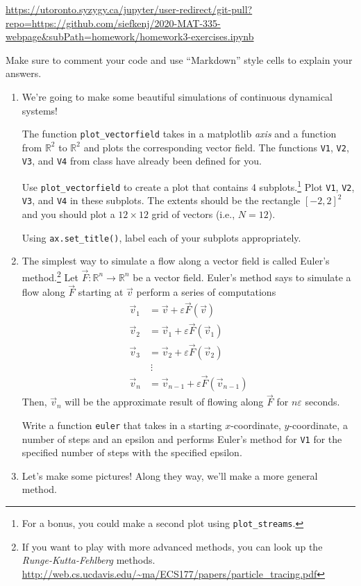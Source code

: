 \documentclass[letter]{article}
\newcommand{\R}{\mathbb{R}}
\begin{document}
	\url{https://utoronto.syzygy.ca/jupyter/user-redirect/git-pull?repo=https://github.com/siefkenj/2020-MAT-335-webpage&subPath=homework/homework3-exercises.ipynb}

	Make sure to comment your code and use ``Markdown'' style cells to explain your answers.

	\begin{enumerate}
		\item We're going to make some beautiful simulations of continuous dynamical systems!

			The function \verb|plot_vectorfield| takes in a matplotlib \emph{axis} and a function from $\R^2$ to $\R^2$
			and plots the corresponding vector field. The functions {\tt V1}, {\tt V2}, {\tt V3}, and {\tt V4} from class
			have already been defined for you.

			Use \verb|plot_vectorfield| to create a plot that contains 4 subplots.\footnote{
				For a bonus, you could make a second plot using {\tt plot\_streams}.} Plot {\tt V1}, {\tt V2}, {\tt V3}, and {\tt V4}
			in these subplots. The extents should be the rectangle $[-2,2]^2$ and you should plot a $12\times 12$ grid of vectors
			(i.e., $N=12$).

			Using \verb|ax.set_title()|, label each of your subplots appropriately.
		\item The simplest way to simulate a flow along a vector field is called Euler's method.\footnote{If you want to play with more advanced
			methods, you can look up the \emph{Runge-Kutta-Fehlberg} methods. \url{http://web.cs.ucdavis.edu/~ma/ECS177/papers/particle_tracing.pdf}}
			Let $\vec F:\R^n\to\R^n$ be a vector field. Euler's method says to simulate a flow along $\vec F$ starting at $\vec v$
			perform a series of computations
			\begin{align*}
				\vec v_1 &= \vec v + \varepsilon \vec F(\vec v)\\
				\vec v_2 &= \vec v_1 + \varepsilon \vec F(\vec v_1)\\
				\vec v_3 &= \vec v_2 + \varepsilon \vec F(\vec v_2)\\
				&~\vdots\\
				\vec v_n &= \vec v_{n-1} + \varepsilon \vec F(\vec v_{n-1})
			\end{align*}
			Then, $\vec v_n$ will be the approximate result of flowing along $\vec F$ for $n\varepsilon$ seconds.

			Write a function {\tt euler} that takes in a starting $x$-coordinate, $y$-coordinate, a number of steps and an epsilon
			and performs Euler's method for {\tt V1} for the specified number of steps with the specified epsilon.
		\item Let's make some pictures! Along they way, we'll make a more general method.


\end{enumerate}
\end{document}
